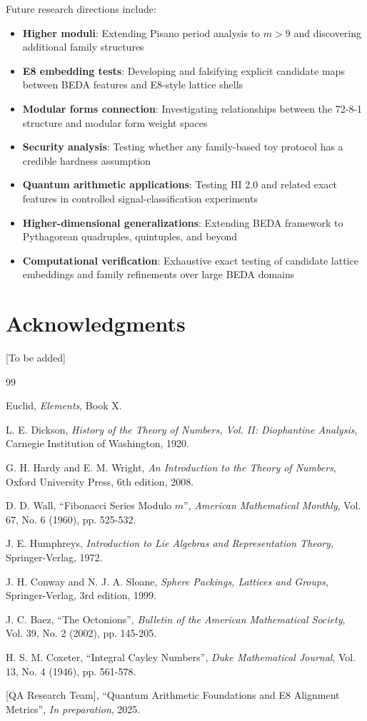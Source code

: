 \documentclass[12pt]{article}
\begin{document}
Future research directions include:
\begin{itemize}
\item \textbf{Higher moduli}: Extending Pisano period analysis to $m > 9$ and discovering additional family structures
\item \textbf{E8 embedding tests}: Developing and falsifying explicit candidate maps between BEDA features and E8-style lattice shells
\item \textbf{Modular forms connection}: Investigating relationships between the 72-8-1 structure and modular form weight spaces
\item \textbf{Security analysis}: Testing whether any family-based toy protocol has a credible hardness assumption
\item \textbf{Quantum arithmetic applications}: Testing HI 2.0 and related exact features in controlled signal-classification experiments
\item \textbf{Higher-dimensional generalizations}: Extending BEDA framework to Pythagorean quadruples, quintuples, and beyond
\item \textbf{Computational verification}: Exhaustive exact testing of candidate lattice embeddings and family refinements over large BEDA domains
\end{itemize}

\section*{Acknowledgments}

[To be added]

\begin{thebibliography}{99}

Euclid, \emph{Elements}, Book X.

L. E. Dickson, \emph{History of the Theory of Numbers, Vol. II: Diophantine Analysis}, Carnegie Institution of Washington, 1920.

G. H. Hardy and E. M. Wright, \emph{An Introduction to the Theory of Numbers}, Oxford University Press, 6th edition, 2008.

D. D. Wall, ``Fibonacci Series Modulo $m$'', \emph{American Mathematical Monthly}, Vol. 67, No. 6 (1960), pp. 525-532.

J. E. Humphreys, \emph{Introduction to Lie Algebras and Representation Theory}, Springer-Verlag, 1972.

J. H. Conway and N. J. A. Sloane, \emph{Sphere Packings, Lattices and Groups}, Springer-Verlag, 3rd edition, 1999.

J. C. Baez, ``The Octonions'', \emph{Bulletin of the American Mathematical Society}, Vol. 39, No. 2 (2002), pp. 145-205.

H. S. M. Coxeter, ``Integral Cayley Numbers'', \emph{Duke Mathematical Journal}, Vol. 13, No. 4 (1946), pp. 561-578.

[QA Research Team], ``Quantum Arithmetic Foundations and E8 Alignment Metrics'', \emph{In preparation}, 2025.

\end{thebibliography}
\end{document}

